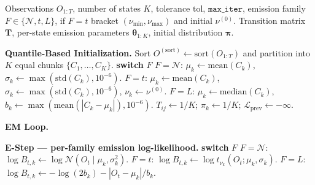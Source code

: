 \begin{algorithm}[tp]
\caption{Unified EM algorithm for the CHMM family. Lines~\ref{line:init}, \ref{line:emit}, and \ref{line:mstep} branch on the emission family $F \in \{\mathcal{N}, t, L\}$; every other line is identical across families. CHMM-N and CHMM-L instantiate classical EM; CHMM-t instantiates an ECM sequence whose second CM step updates $\nu_k$ by a one-dimensional golden-section search on the per-state $Q$-function.}
\label{alg:chmm_em}
\small
\begin{algorithmic}[1]
\REQUIRE Observations $O_{1:T}$, number of states $K$, tolerance $\text{tol}$, $\texttt{max\_iter}$, emission family $F \in \{\mathcal{N}, t, L\}$, if $F = t$ bracket $(\nu_{\min}, \nu_{\max})$ and initial $\nu^{(0)}$.
\ENSURE Transition matrix $\mathbf{T}$, per-state emission parameters $\boldsymbol\theta_{1:K}$, initial distribution $\boldsymbol{\pi}$.

\STATE \textbf{Quantile-Based Initialization.}
\STATE Sort $O^{(\text{sort})} \leftarrow \text{sort}(O_{1:T})$ and partition into $K$ equal chunks $\{C_1,\ldots,C_K\}$.
 \label{line:init}
    \STATE \textbf{switch} $F$
    \STATE \quad $F = \mathcal{N}$: $\mu_k \leftarrow \text{mean}(C_k)$, \quad $\sigma_k \leftarrow \max(\text{std}(C_k), 10^{-6})$.
    \STATE \quad $F = t$: $\mu_k \leftarrow \text{mean}(C_k)$, \quad $\sigma_k \leftarrow \max(\text{std}(C_k), 10^{-6})$, \quad $\nu_k \leftarrow \nu^{(0)}$.
    \STATE \quad $F = L$: $\mu_k \leftarrow \text{median}(C_k)$, \quad $b_k \leftarrow \max(\text{mean}(|C_k - \mu_k|), 10^{-6})$.
\ENDFOR
\STATE $T_{ij} \leftarrow 1/K$; \quad $\pi_k \leftarrow 1/K$; \quad $\mathcal{L}_{\text{prev}} \leftarrow -\infty$.

\STATE \textbf{EM Loop.}

    \STATE \textbf{E-Step --- per-family emission log-likelihood.} \label{line:emit}
    \STATE \textbf{switch} $F$
    \STATE \quad $F = \mathcal{N}$: $\log B_{t,k} \leftarrow \log \mathcal{N}(O_t \mid \mu_k, \sigma_k^2)$.
    \STATE \quad $F = t$: $\log B_{t,k} \leftarrow \log t_{\nu_k}(O_t; \mu_k, \sigma_k)$.
    \STATE \quad $F = L$: $\log B_{t,k} \leftarrow -\log(2 b_k) - |O_t - \mu_k|/b_k$.


\end{algorithmic}
\end{algorithm}
